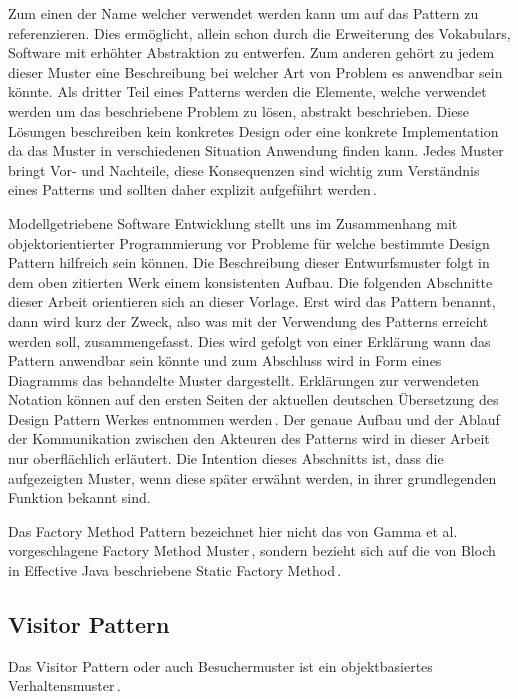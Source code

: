 \documentclass[12pt,oneside,a4paper,parskip]{scrbook}
\begin{document}
Zum einen der Name welcher verwendet werden kann um auf das Pattern zu referenzieren. Dies ermöglicht, allein schon durch die Erweiterung des Vokabulars, Software mit erhöhter Abstraktion zu entwerfen. Zum anderen gehört zu jedem dieser Muster eine Beschreibung bei welcher Art von Problem es anwendbar sein könnte. Als dritter Teil eines Patterns werden die Elemente, welche verwendet werden um das beschriebene Problem zu lösen, abstrakt beschrieben. Diese Lösungen beschreiben kein konkretes Design oder eine konkrete Implementation da das Muster in verschiedenen Situation Anwendung finden kann. Jedes Muster bringt Vor- und Nachteile, diese Konsequenzen sind wichtig zum Verständnis eines Patterns und sollten daher explizit aufgeführt werden\,\cite[S.30 f.]{gamma2015}.

Modellgetriebene Software Entwicklung stellt uns im Zusammenhang mit objektorientierter Programmierung vor Probleme für welche bestimmte Design Pattern hilfreich sein können. Die Beschreibung dieser Entwurfsmuster folgt in dem oben zitierten Werk einem konsistenten Aufbau. Die folgenden Abschnitte dieser Arbeit orientieren sich an dieser Vorlage. Erst wird das Pattern benannt, dann wird kurz der Zweck, also was mit der Verwendung des Patterns erreicht werden soll, zusammengefasst. Dies wird gefolgt von einer Erklärung wann das Pattern anwendbar sein könnte und zum Abschluss wird in Form eines Diagramms das behandelte Muster dargestellt. Erklärungen zur verwendeten Notation können auf den ersten Seiten der aktuellen deutschen Übersetzung des Design Pattern Werkes entnommen werden\,\cite[S. 8]{gamma2015}. Der genaue Aufbau und der Ablauf der Kommunikation zwischen den Akteuren des Patterns wird in dieser Arbeit nur oberflächlich erläutert. Die Intention dieses Abschnitts ist, dass die aufgezeigten Muster, wenn diese später erwähnt werden, in ihrer grundlegenden Funktion bekannt sind.

Das Factory Method Pattern bezeichnet hier nicht das von Gamma et al. vorgeschlagene Factory Method Muster\,\cite[S. 173ff.]{gamma2015}, sondern bezieht sich auf die von Bloch in Effective Java beschriebene Static Factory Method\,\cite[S. 5ff.]{bloch2017}.

\subsection{Visitor Pattern}

Das Visitor Pattern oder auch Besuchermuster ist ein objektbasiertes Verhaltensmuster\,\cite[S. 480]{gamma2015}.
\end{document}
